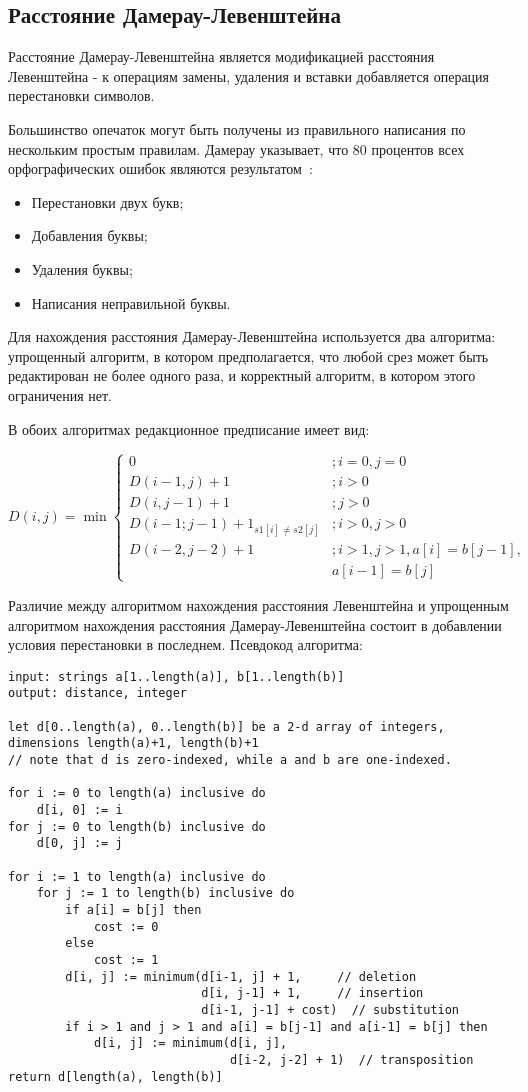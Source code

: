 \subsection{Расстояние Дамерау-Левенштейна}\label{damLev}
Расстояние Дамерау-Левенштейна является модификацией расстояния Левенштейна - к операциям замены, удаления и вставки добавляется операция перестановки символов.

Большинство опечаток могут быть получены из правильного написания по нескольким простым правилам. Дамерау указывает, что 80 процентов всех орфографических ошибок являются результатом~\cite{damerau}:

\begin{itemize}
	\item Перестановки двух букв;
	\item Добавления буквы;
	\item Удаления буквы;
	\item Написания неправильной буквы.
\end{itemize}

Для нахождения расстояния Дамерау-Левенштейна используется два алгоритма: упрощенный алгоритм, в котором предполагается, что любой срез может быть редактирован не более одного раза, и корректный алгоритм, в котором этого ограничения нет.

В обоих алгоритмах редакционное предписание имеет вид:

\[
D(i, j) = \min\begin{cases}
0 & ; i = 0, j = 0 \\
D(i-1, j) + 1 & ; i > 0 \\
D(i, j - 1) + 1 & ; j > 0 \\ 
D(i - 1; j - 1) + 1_{s1[i] \neq s2[j]} & ; i > 0, j > 0\\

D(i - 2, j - 2) + 1 & ; i > 1, j > 1, a[i] = b[j - 1],\\ & a[i - 1] = b[j]
\end{cases}
\]

Различие между алгоритмом нахождения расстояния Левенштейна и упрощенным алгоритмом нахождения расстояния Дамерау-Левенштейна состоит в добавлении условия перестановки в последнем. Псевдокод алгоритма:

\begin{lstlisting}
input: strings a[1..length(a)], b[1..length(b)]
output: distance, integer

let d[0..length(a), 0..length(b)] be a 2-d array of integers, dimensions length(a)+1, length(b)+1
// note that d is zero-indexed, while a and b are one-indexed.

for i := 0 to length(a) inclusive do
	d[i, 0] := i
for j := 0 to length(b) inclusive do
	d[0, j] := j

for i := 1 to length(a) inclusive do
	for j := 1 to length(b) inclusive do
		if a[i] = b[j] then
			cost := 0
		else
			cost := 1
		d[i, j] := minimum(d[i-1, j] + 1,     // deletion
						   d[i, j-1] + 1,     // insertion
						   d[i-1, j-1] + cost)  // substitution
		if i > 1 and j > 1 and a[i] = b[j-1] and a[i-1] = b[j] then
			d[i, j] := minimum(d[i, j],
							   d[i-2, j-2] + 1)  // transposition
return d[length(a), length(b)]
\end{lstlisting}

